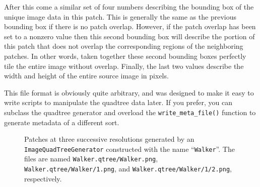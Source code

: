 After this come a similar set of four numbers describing the bounding
box of the unique image data in this patch.  This is generally the
same as the previous bounding box if there is no patch overlap.
However, if the patch overlap has been set to a nonzero value then
this second bounding box will describe the portion of this patch that
does not overlap the corresponding regions of the neighboring patches.
In other words, taken together these second bounding boxes perfectly
tile the entire image without overlap.  Finally, the last two values
describe the width and height of the entire source image in pixels.

This file format is obviously quite arbitrary, and was designed to 
make it easy to write scripts to manipulate the quadtree data later.  
If you prefer, you can subclass the quadtree generator and overload 
the \verb#write_meta_file()# function to generate metadata of a 
different sort.

\begin{figure}[t]
\centering
  \hfil
  \hfil
\caption{Patches at three successive resolutions generated by an {\tt ImageQuadTreeGenerator} 
constructed with the name ``{\tt Walker}''.  The files are named {\tt Walker.qtree/Walker.png}, 
{\tt Walker.qtree/Walker/1.png}, and {\tt Walker.qtree/Walker/1/2.png}, respectively.}
\label{fig:blend}
\end{figure}
